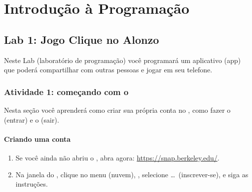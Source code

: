 \chapter{Introdução à Programação}
\label{cap:un1}


\section{Lab 1: Jogo Clique no Alonzo}
\label{cap:un1-lab1}

Neste Lab (laboratório de programação) você programará um aplicativo (app) que
poderá compartilhar com outras pessoas e jogar em seu telefone.


\subsection{Atividade 1: começando com o \snap}
\label{cap:un1-lab1-01}

Nesta seção você aprenderá como criar sua própria conta no \snap, como fazer o
 (entrar) e o  (sair).

\subsubsection{Criando uma conta}
\label{cap:un1-lab1-01-a}

\begin{enumerate}
\item Se você ainda não abriu o \snap, abra agora:
      \url{https://snap.berkeley.edu/}.

\item Na janela do \snap, clique no menu  (nuvem),
      , selecione
      \ldots\ (inscrever-se), e siga as instruções.
\end{enumerate}

